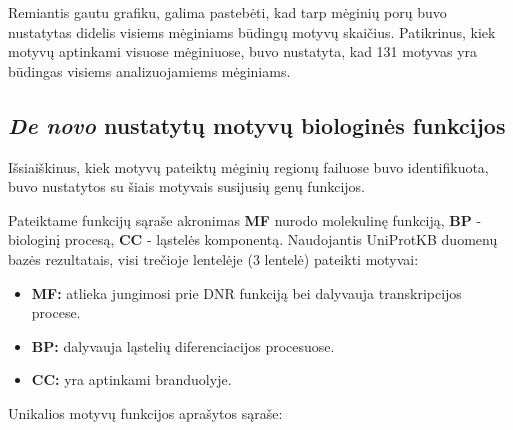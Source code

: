 \documentclass[12pt]{article}
\begin{document}
Remiantis gautu grafiku, galima pastebėti, kad tarp mėginių porų buvo
nustatytas didelis visiems mėginiams būdingų motyvų skaičius. Patikrinus, kiek
motyvų aptinkami visuose mėginiuose, buvo nustatyta, kad 131 motyvas yra
būdingas visiems analizuojamiems mėginiams.

\subsection{\emph{De novo} nustatytų motyvų biologinės funkcijos}
Išsiaiškinus, kiek motyvų pateiktų mėginių regionų failuose buvo identifikuota,
buvo nustatytos su šiais motyvais susijusių genų funkcijos.

Pateiktame funkcijų sąraše akronimas \textbf{MF} nurodo molekulinę funkciją,
\textbf{BP} - biologinį procesą, \textbf{CC} - ląstelės komponentą. Naudojantis
UniProtKB\cite{UNIPROTKB} duomenų bazės rezultatais, visi trečioje lentelėje
(3 lentelė) pateikti motyvai:

\begin{itemize}
    \item \textbf{MF:} atlieka jungimosi prie DNR funkciją bei dalyvauja
        transkripcijos procese.
    \item \textbf{BP:} dalyvauja ląstelių diferenciacijos procesuose.
    \item \textbf{CC:} yra aptinkami branduolyje.
\end{itemize}

\newpage

Unikalios motyvų funkcijos aprašytos sąraše:
\end{document}
